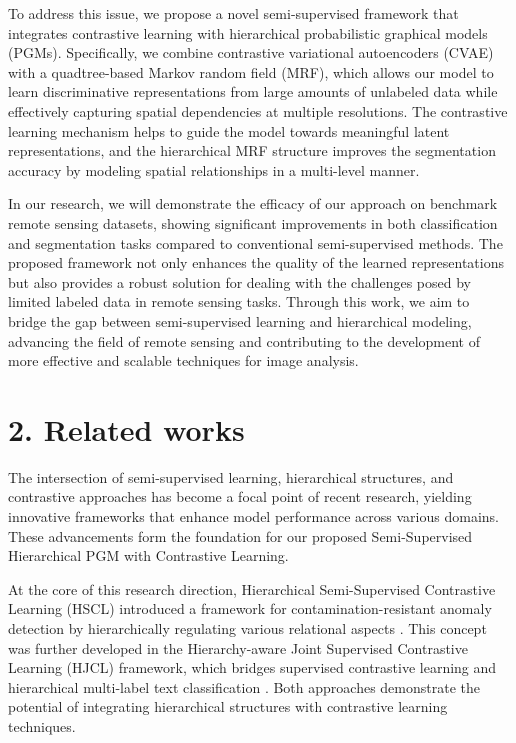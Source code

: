 \documentclass[conference]{IEEEtran}
\begin{document}
To address this issue, we propose a novel semi-supervised framework that integrates contrastive learning with hierarchical probabilistic graphical models (PGMs). Specifically, we combine contrastive variational autoencoders (CVAE) with a quadtree-based Markov random field (MRF), which allows our model to learn discriminative representations from large amounts of unlabeled data while effectively capturing spatial dependencies at multiple resolutions\cite{zerubia2021hierarchical}. The contrastive learning mechanism helps to guide the model towards meaningful latent representations, and the hierarchical MRF structure improves the segmentation accuracy by modeling spatial relationships in a multi-level manner\cite{jain2022multimodal}.

In our research, we will demonstrate the efficacy of our approach on benchmark remote sensing datasets, showing significant improvements in both classification and segmentation tasks compared to conventional semi-supervised methods\cite{wang2022enhancing}. The proposed framework not only enhances the quality of the learned representations but also provides a robust solution for dealing with the challenges posed by limited labeled data in remote sensing tasks. Through this work, we aim to bridge the gap between semi-supervised learning and hierarchical modeling, advancing the field of remote sensing and contributing to the development of more effective and scalable techniques for image analysis\cite{pastorino2021hierarchical}.

\section*{2. Related works}
The intersection of semi-supervised learning, hierarchical structures, and contrastive approaches has become a focal point of recent research, yielding innovative frameworks that enhance model performance across various domains. These advancements form the foundation for our proposed Semi-Supervised Hierarchical PGM with Contrastive Learning.

At the core of this research direction, Hierarchical Semi-Supervised Contrastive Learning (HSCL) introduced a framework for contamination-resistant anomaly detection by hierarchically regulating various relational aspects \cite{hscl}. This concept was further developed in the Hierarchy-aware Joint Supervised Contrastive Learning (HJCL) framework, which bridges supervised contrastive learning and hierarchical multi-label text classification \cite{hjcl}. Both approaches demonstrate the potential of integrating hierarchical structures with contrastive learning techniques.
\end{document}
